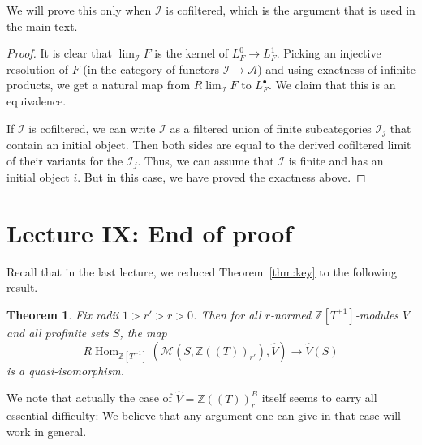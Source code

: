 \documentclass[11pt]{amsbook}
\DeclareMathOperator{\Hom}{Hom}
\numberwithin{equation}{section}
\newtheorem{theorem}{Theorem}
\numberwithin{theorem}{section}
\theoremstyle{definition}
\begin{document}
We will prove this only when $\mathcal I$ is cofiltered, which is the argument that is used in the main text.

\begin{proof} It is clear that $\lim_{\mathcal I} F$ is the kernel of $L_F^0\to L_F^1$. Picking an injective resolution of $F$ (in the category of functors $\mathcal I\to \mathcal A$) and using exactness of infinite products, we get a natural map from $R\lim_{\mathcal I} F$ to $L_F^\bullet$. We claim that this is an equivalence.

If $\mathcal I$ is cofiltered, we can write $\mathcal I$ as a filtered union of finite subcategories $\mathcal I_j$ that contain an initial object. Then both sides are equal to the derived cofiltered limit of their variants for the $\mathcal I_j$. Thus, we can assume that $\mathcal I$ is finite and has an initial object $i$. But in this case, we have proved the exactness above.
\end{proof}

\newpage

\section{Lecture IX: End of proof}

Recall that in the last lecture, we reduced Theorem~\ref{thm:key} to the following result.

\begin{theorem}\label{thm:explicit1} Fix radii $1>r'>r>0$. Then for all $r$-normed $\mathbb Z[T^{\pm 1}]$-modules $V$ and all profinite sets $S$, the map
\[
R\Hom_{\mathbb Z[T^{-1}]}(\mathcal M(S,\mathbb Z((T))_{r'}),\widehat{V})\to \widehat{V}(S)
\]
is a quasi-isomorphism.
\end{theorem}

We note that actually the case of $\widehat{V}=\mathbb Z((T))_r^B$ itself seems to carry all essential difficulty: We believe that any argument one can give in that case will work in general.
\end{document}
